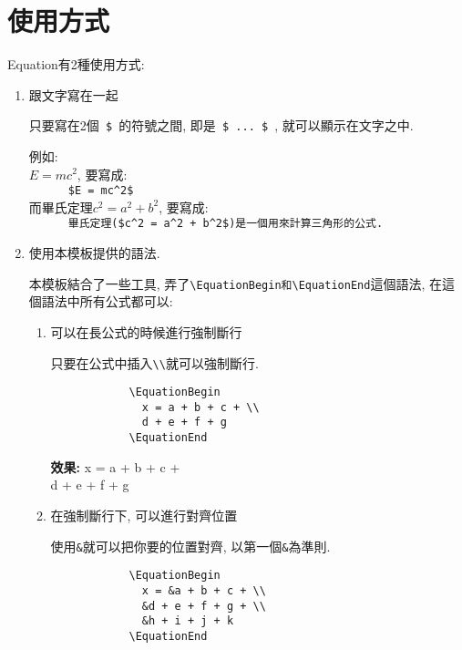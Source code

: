 \section{使用方式}
Equation有2種使用方式:
  \begin{enumerate}
    \item
    {
      跟文字寫在一起

      只要寫在2個\verb| $ |的符號之間, 即是\verb| $ ... $ |, 就可以顯示在文字之中.

      \noindent 例如:\\
      $E = mc^2$, 要寫成:\\
      \verb|      $E = mc^2$|\\
      而畢氏定理$c^2 = a^2 + b^2$, 要寫成:\\
      \verb|      畢氏定理($c^2 = a^2 + b^2$)是一個用來計算三角形的公式.|
    } %

    \item
    {
      使用本模板提供的語法.

      本模板結合了一些工具, 弄了\verb|\EquationBegin和\EquationEnd|這個語法, 在這個語法中所有公式都可以:
      \begin{enumerate}
        \item
        {
          可以在長公式的時候進行強制斷行

          只要在公式中插入\verb|\\|就可以強制斷行.
          \begin{verbatim}
            \EquationBegin
              x = a + b + c + \\
              d + e + f + g
            \EquationEnd
          \end{verbatim}

          {\bf 效果:}
          \EquationBegin
            x = a + b + c + \\
            d + e + f + g
          \EquationEnd
        } %

        \newpage
        \item
        {
          在強制斷行下, 可以進行對齊位置

          使用\verb|&|就可以把你要的位置對齊, 以第一個\verb|&|為準則.
          \begin{verbatim}
            \EquationBegin
              x = &a + b + c + \\
              &d + e + f + g + \\
              &h + i + j + k
            \EquationEnd
          \end{verbatim}

}
\end{enumerate}}
\end{enumerate}
